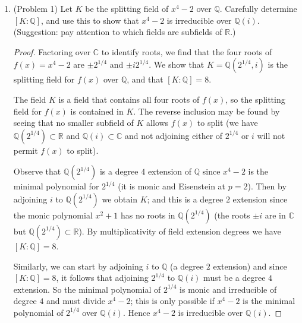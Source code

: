 \documentclass[11pt]{article}
\newcommand{\cbr}[1]{\left\{#1\right\}}
\begin{document}
\begin{enumerate}
\begin{proof}
        Suppose not, so that the degree of $m_\alpha(x-t)$ for each $t$ is some $j$ for $2\leq j\leq p-1$. Since each of the $\alpha+t$ are roots of $f(x)$, we have that there is a subset $A\subset \cbr{m_\alpha(x-t)\mid t\in \mathbb{F}_p}$ for which the product $\prod_{m(x) \in A}m(x)$ divides $f(x)$ and every $\alpha-t$ is a root of the product. But the degree of the product is $j\cdot\abs{A}$, which is equal to $p$, a prime. So one of $j$ or $\abs{A}$ has to be $1$, but $\abs{A}$ cannot be $p$ since we saw that $m_\alpha(x-t)$ for any $t$ is not linear. So $j$ must be $p$, from which it follows that $m_\alpha(x)$ is $f(x)$, meaning $x^p-x+a$ is irreducible.
    \end{proof}
    \item (Problem 1) Let $K$ be the splitting field of $x^4-2$ over $\mathbb{Q}$. Carefully determine $[K\colon \mathbb{Q}]$, and use this to show that $x^4-2$ is irreducible over $\mathbb{Q}(i)$. (Suggestion: pay attention to which fields are subfields of $\mathbb{R}$.) \begin{proof}
        Factoring over $\mathbb{C}$ to identify roots, we find that the four roots of $f(x) = x^4-2$ are $\pm 2^{1/4}$ and $\pm i 2^{1/4}$. We show that $K = \mathbb{Q}(2^{1/4}, i)$ is the splitting field for $f(x)$ over $\mathbb{Q}$, and that $[K\colon\mathbb{Q}] = 8$. 

        The field $K$ is a field that contains all four roots of $f(x)$, so the splitting field for $f(x)$ is contained in $K$. The reverse inclusion may be found by seeing that no smaller subfield of $K$ allows $f(x)$ to split (we have $\mathbb{Q}(2^{1/4})\subset \mathbb{R}$ and $\mathbb{Q}(i)\subset \mathbb{C}$ and not adjoining either of $2^{1/4}$ or $i$ will not permit $f(x)$ to split).
        
        Observe that $\mathbb{Q}(2^{1/4})$ is a degree $4$ extension of $\mathbb{Q}$ since $x^4-2$ is the minimal polynomial for $2^{1/4}$ (it is monic and Eisenstein at $p=2$). Then by adjoining $i$ to $\mathbb{Q}(2^{1/4})$ we obtain $K$; and this is a degree $2$ extension since the monic polynomial $x^2+1$ has no roots in $\mathbb{Q}(2^{1/4})$ (the roots $\pm i$ are in $\mathbb{C}$ but $\mathbb{Q}(2^{1/4})\subset \mathbb{R}$). By multiplicativity of field extension degrees we have $[K\colon \mathbb{Q}] = 8$.

        Similarly, we can start by adjoining $i$ to $\mathbb{Q}$ (a degree $2$ extension) and since $[K\colon\mathbb{Q}] = 8$, it follows that adjoining $2^{1/4}$ to $\mathbb{Q}(i)$ must be a degree $4$ extension. So the minimal polynomial of $2^{1/4}$ is monic and irreducible of degree $4$ and must divide $x^4-2$; this is only possible if $x^4-2$ is the minimal polynomial of $2^{1/4}$ over $\mathbb{Q}(i)$. Hence $x^4-2$ is irreducible over $\mathbb{Q}(i)$.
    \end{proof}
\end{enumerate}
\end{document}
